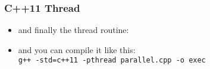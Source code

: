 \documentclass[aspectratio=43,11pt]{beamer}
\begin{document}
\begin{frame}
  \frametitle{C++11 Thread}

  \begin{itemize}
    \item and finally the thread routine:
    
    \item and you can compile it like this: \\
    {\tt g++ -std=c++11 -pthread parallel.cpp -o exec}
  \end{itemize}
  \let\thefootnote\relax{}
\end{frame}
\end{document}
